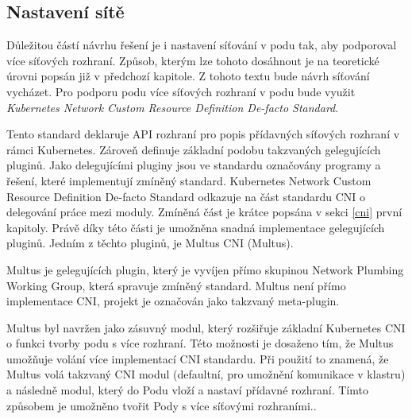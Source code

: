 \subsection{Nastavení sítě}
Důležitou částí návrhu řešení je i nastavení síťování v podu tak, aby podporoval více síťových rozhraní. Způsob, kterým lze tohoto dosáhnout je na teoretické úrovni popsán již v předchozí kapitole. Z tohoto textu bude návrh síťování vycházet. Pro podporu podu více síťových rozhraní v podu bude využit \textit{Kubernetes Network Custom Resource Definition De-facto Standard}.   

Tento standard deklaruje API rozhraní pro popis přídavných síťových rozhraní v rámci Kubernetes. Zároveň definuje základní podobu takzvaných gelegujících pluginů. Jako delegujícími pluginy jsou ve standardu označovány programy a řešení, které implementují zmíněný standard. Kubernetes Network Custom Resource Definition De-facto Standard odkazuje na část standardu CNI o delegování práce mezi moduly. Zmíněná část je krátce popsána v sekci \ref{cni}  první kapitoly. Právě díky této části je umožněna snadná implementace gelegujících pluginů. Jedním z těchto pluginů, je Multus CNI (Multus). 



Multus je gelegujících plugin, který je vyvíjen přímo skupinou Network Plumbing Working Group, která spravuje zmíněný standard. Multus není přímo implementace CNI, projekt je označován jako takzvaný meta-plugin. \cite{hayashi_2019_multuscni}

Multus byl navržen jako zásuvný modul, který rozšiřuje základní Kubernetes CNI o funkci tvorby podu s více rozhraní. Této možnosti je dosaženo tím, že Multus umožňuje volání více implementací CNI standardu. Při použití to znamená, že Multus volá takzvaný  CNI modul (defaultní, pro umožnění komunikace v klastru) a následně  modul, který do Podu vloží a nastaví přídavné rozhraní. Tímto způsobem je umožněno tvořit Pody s více síťovými rozhraními.. \cite{hayashi_2019_multuscni}

